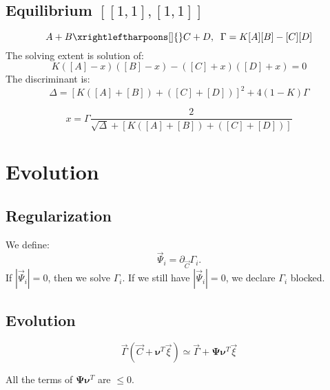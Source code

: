\documentclass[aps,12pt]{revtex4}
\begin{document}
\subsection{Equilibrium $[ [1,1], [1,1]]$}
\begin{equation}
	A+B \xrightleftharpoons[]{} C+D, \;\; \Gamma = K[A][B] - [C][D]
\end{equation}
The solving extent is solution of:
\begin{equation}
	K([A]-x)([B]-x) - ([C]+x)([D]+x)= 0
\end{equation}
The discriminant is:
\begin{equation}
	\Delta = \left[K([A]+[B])+([C]+[D])\right]^2 + 4 (1-K) \Gamma
\end{equation}

\begin{equation}
x = \Gamma \dfrac{2}{\sqrt{\Delta}+\left[K([A]+[B])+([C]+[D])\right]}
\end{equation}

\section{Evolution}

\subsection{Regularization}
We define:
\begin{equation}
\vec{\Psi}_i = \partial_{\vec{C}} \Gamma_i.
\end{equation}
If $|\vec{\Psi}_i|=0$, then we solve $\Gamma_i$. If we still have $|\vec{\Psi}_i|=0$, we declare $\Gamma_i$ blocked.

\subsection{Evolution}

\begin{equation}
	\vec{\Gamma}(\vec{C}+\bm{\nu}^T \vec{\xi}) \simeq \vec{\Gamma} + \bm{\Psi} \bm{\nu}^T \vec{\xi}
\end{equation}	

All the terms of $	\bm{\Psi} \bm{\nu}^T $ are $\leq 0$.




 


 
\end{document}
